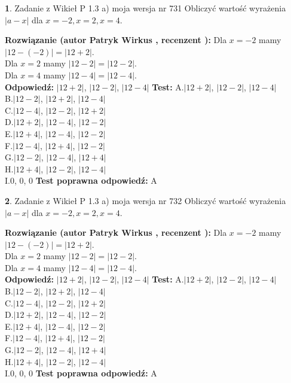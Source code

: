 \documentclass[12pt, a4paper]{article}
\theoremstyle{definition} %
\newtheorem{zad}{}
\newcommand{\zadStart}[1]{\begin{zad}#1\newline}
\newcommand{\zadStop}{\end{zad}}
\newcommand{\rozwStart}[2]{\noindent \textbf{Rozwiązanie (autor #1 , recenzent #2): }\newline}
\newcommand{\rozwStop}{\newline}
\newcommand{\odpStart}{\noindent \textbf{Odpowiedź:}\newline}
\newcommand{\odpStop}{\newline}
\newcommand{\testStart}{\noindent \textbf{Test:}\newline}
\newcommand{\testStop}{\newline}
\newcommand{\kluczStart}{\noindent \textbf{Test poprawna odpowiedź:}\newline}
\newcommand{\kluczStop}{\newline}
\begin{document}
\zadStart{Zadanie z Wikieł P 1.3 a) moja wersja nr 731}
Obliczyć wartość wyrażenia $|a - x|$ dla $x=-2,x=2,x=4$.
\zadStop
\rozwStart{Patryk Wirkus}{}
Dla $x = -2$ mamy $|12 - (-2)| = |12 + 2|$.\\
Dla $x = 2$ mamy $|12 - 2| = |12 - 2|$.\\
Dla $x = 4$ mamy $|12 - 4| = |12 - 4|$.\\
\rozwStop
\odpStart
$|12 + 2|$, $|12 - 2|$, $|12 - 4|$
\odpStop
\testStart
A.$|12 + 2|$, $|12 - 2|$, $|12 - 4|$\\
B.$|12 - 2|$, $|12 + 2|$, $|12 - 4|$\\
C.$|12 - 4|$, $|12 - 2|$, $|12 + 2|$\\
D.$|12 + 2|$, $|12 - 4|$, $|12 - 2|$\\
E.$|12 + 4|$, $|12 - 4|$, $|12 - 2|$\\
F.$|12 - 4|$, $|12 + 4|$, $|12 - 2|$\\
G.$|12 - 2|$, $|12 - 4|$, $|12 + 4|$\\
H.$|12 + 4|$, $|12 - 2|$, $|12 - 4|$\\
I.$0$, $0$, $0$
\testStop
\kluczStart
A
\kluczStop



\zadStart{Zadanie z Wikieł P 1.3 a) moja wersja nr 732}
Obliczyć wartość wyrażenia $|a - x|$ dla $x=-2,x=2,x=4$.
\zadStop
\rozwStart{Patryk Wirkus}{}
Dla $x = -2$ mamy $|12 - (-2)| = |12 + 2|$.\\
Dla $x = 2$ mamy $|12 - 2| = |12 - 2|$.\\
Dla $x = 4$ mamy $|12 - 4| = |12 - 4|$.\\
\rozwStop
\odpStart
$|12 + 2|$, $|12 - 2|$, $|12 - 4|$
\odpStop
\testStart
A.$|12 + 2|$, $|12 - 2|$, $|12 - 4|$\\
B.$|12 - 2|$, $|12 + 2|$, $|12 - 4|$\\
C.$|12 - 4|$, $|12 - 2|$, $|12 + 2|$\\
D.$|12 + 2|$, $|12 - 4|$, $|12 - 2|$\\
E.$|12 + 4|$, $|12 - 4|$, $|12 - 2|$\\
F.$|12 - 4|$, $|12 + 4|$, $|12 - 2|$\\
G.$|12 - 2|$, $|12 - 4|$, $|12 + 4|$\\
H.$|12 + 4|$, $|12 - 2|$, $|12 - 4|$\\
I.$0$, $0$, $0$
\testStop
\kluczStart
A
\kluczStop
\end{document}
